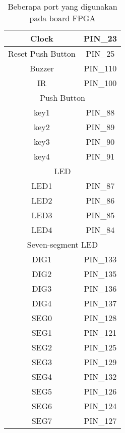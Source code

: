 \begin{table}[H]
\caption{Beberapa port yang digunakan pada board FPGA}\label{tab:pin}
\centering
\begin{tabular}{|c|c|}
\hline 
Clock & PIN\_23\\
\hline 
Reset Push Button & PIN\_25\\
\hline 
Buzzer & PIN\_110 \\
\hline
IR & PIN\_100 \\
\hline 
\multicolumn{2}{|c|}{Push Button}\\
\hline 
key1 & PIN\_88 \\
\hline 
key2 & PIN\_89 \\
\hline 
key3 & PIN\_90 \\
\hline 
key4 & PIN\_91 \\
\hline 
\multicolumn{2}{|c|}{LED} \\
\hline 
LED1 & PIN\_87 \\
\hline 
LED2 & PIN\_86 \\
\hline 
LED3 & PIN\_85 \\
\hline 
LED4 & PIN\_84 \\
\hline 
\multicolumn{2}{|c|}{Seven-segment LED} \\
\hline 
DIG1 & PIN\_133 \\
\hline 
DIG2 & PIN\_135 \\
\hline 
DIG3 & PIN\_136 \\
\hline 
DIG4 & PIN\_137 \\
\hline 
SEG0 & PIN\_128 \\
\hline 
SEG1 & PIN\_121 \\
\hline 
SEG2 & PIN\_125 \\
\hline
SEG3 & PIN\_129 \\
\hline
SEG4 & PIN\_132 \\
\hline
SEG5 & PIN\_126 \\
\hline
SEG6 & PIN\_124 \\
\hline
SEG7 & PIN\_127 \\
\hline 
\end{tabular}
\par
\end{table}

